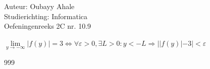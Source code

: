 \documentclass[a4paper]{article}
\newcommand{\llim}{\lim\limits}
\begin{document}
  
\noindent \large Auteur: Oubayy Ahale          \\
\noindent \large Studierichting: Informatica   \\
\noindent \large Oefeningenreeks 2C nr. 10.9    \\

\medskip

\normalsize

$\llim_{y \rightarrow -\infty} |f(y)| = 3 \Leftrightarrow \forall \varepsilon > 0, \exists L > 0 : y < -L \Rightarrow ||f(y)| - 3| < \varepsilon$\\

\begin{thebibliography}{999}
\end{thebibliography}
\end{document}
